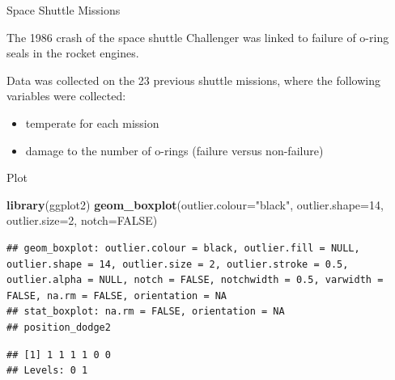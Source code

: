 \documentclass[
  ignorenonframetext,
]{beamer}
\newenvironment{Shaded}{\begin{snugshade}}{\end{snugshade}}
\newcommand{\DataTypeTok}[1]{\textcolor[rgb]{0.13,0.29,0.53}{#1}}
\newcommand{\DecValTok}[1]{\textcolor[rgb]{0.00,0.00,0.81}{#1}}
\newcommand{\KeywordTok}[1]{\textcolor[rgb]{0.13,0.29,0.53}{\textbf{#1}}}
\newcommand{\NormalTok}[1]{#1}
\newcommand{\OperatorTok}[1]{\textcolor[rgb]{0.81,0.36,0.00}{\textbf{#1}}}
\newcommand{\OtherTok}[1]{\textcolor[rgb]{0.56,0.35,0.01}{#1}}
\newcommand{\StringTok}[1]{\textcolor[rgb]{0.31,0.60,0.02}{#1}}
\providecommand{\tightlist}{%
  \setlength{\itemsep}{0pt}\setlength{\parskip}{0pt}}
\begin{document}
\begin{frame}{Space Shuttle Missions}
\protect\hypertarget{space-shuttle-missions}{}

The 1986 crash of the space shuttle Challenger was linked to failure of
o-ring seals in the rocket engines.

Data was collected on the 23 previous shuttle missions, where the
following variables were collected:

\begin{itemize}
\tightlist
\item
  temperate for each mission
\item
  damage to the number of o-rings (failure versus non-failure)
\end{itemize}

\end{frame}

\begin{frame}[fragile]{Plot}
\protect\hypertarget{plot}{}

\begin{Shaded}
\begin{Highlighting}[]
\KeywordTok{library}\NormalTok{(ggplot2)}
\KeywordTok{geom_boxplot}\NormalTok{(}\DataTypeTok{outlier.colour=}\StringTok{"black"}\NormalTok{, }\DataTypeTok{outlier.shape=}\DecValTok{14}\NormalTok{,}
             \DataTypeTok{outlier.size=}\DecValTok{2}\NormalTok{, }\DataTypeTok{notch=}\OtherTok{FALSE}\NormalTok{)}
\end{Highlighting}
\end{Shaded}

\begin{verbatim}
## geom_boxplot: outlier.colour = black, outlier.fill = NULL, outlier.shape = 14, outlier.size = 2, outlier.stroke = 0.5, outlier.alpha = NULL, notch = FALSE, notchwidth = 0.5, varwidth = FALSE, na.rm = FALSE, orientation = NA
## stat_boxplot: na.rm = FALSE, orientation = NA
## position_dodge2
\end{verbatim}

\begin{Shaded}
\end{Shaded}

\begin{verbatim}
## [1] 1 1 1 1 0 0
## Levels: 0 1
\end{verbatim}

\end{frame}
\end{document}
